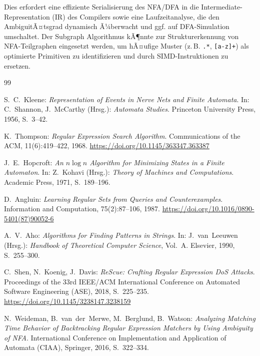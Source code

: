 ﻿\documentclass[a4paper,12pt]{article}
\theoremstyle{definition}
\begin{document}
Dies erfordert eine effiziente Serialisierung des NFA/DFA in die
Intermediate-Representation (IR) des Compilers sowie eine Laufzeitanalyse,
die den AmbiguitÃ¤tsgrad dynamisch Ã¼berwacht und ggf. auf DFA-Simulation
umschaltet. Der Subgraph Algorithmus kÃ¶nnte zur Strukturerkennung von
NFA-Teilgraphen eingesetzt werden, um hÃ¤ufige Muster (z.\,B. \texttt{.*},
\texttt{[a-z]+}) als optimierte Primitiven zu identifizieren und durch
SIMD-Instruktionen zu ersetzen.

\begin{thebibliography}{99}

S.~C.~Kleene:
\textit{Representation of Events in Nerve Nets and Finite Automata}.
In: C.~Shannon, J.~McCarthy (Hrsg.): \textit{Automata Studies}.
Princeton University Press, 1956, S.~3--42.

K.~Thompson:
\textit{Regular Expression Search Algorithm}.
Communications of the ACM, 11(6):419--422, 1968.
\url{https://doi.org/10.1145/363347.363387}

J.~E.~Hopcroft:
\textit{An $n \log n$ Algorithm for Minimizing States in a Finite Automaton}.
In: Z.~Kohavi (Hrsg.): \textit{Theory of Machines and Computations}.
Academic Press, 1971, S.~189--196.

D.~Angluin:
\textit{Learning Regular Sets from Queries and Counterexamples}.
Information and Computation, 75(2):87--106, 1987.
\url{https://doi.org/10.1016/0890-5401(87)90052-6}

A.~V.~Aho:
\textit{Algorithms for Finding Patterns in Strings}.
In: J.~van~Leeuwen (Hrsg.): \textit{Handbook of Theoretical Computer Science},
Vol.~A. Elsevier, 1990, S.~255--300.

C.~Shen, N.~Koenig, J.~Davis:
\textit{ReScue: Crafting Regular Expression DoS Attacks}.
Proceedings of the 33rd IEEE/ACM International Conference on Automated
Software Engineering (ASE), 2018, S.~225--235.
\url{https://doi.org/10.1145/3238147.3238159}

N.~Weideman, B.~van~der~Merwe, M.~Berglund, B.~Watson:
\textit{Analyzing Matching Time Behavior of Backtracking Regular Expression Matchers
by Using Ambiguity of NFA}.
International Conference on Implementation and Application of Automata (CIAA),
Springer, 2016, S.~322--334.


\end{thebibliography}
\end{document}
